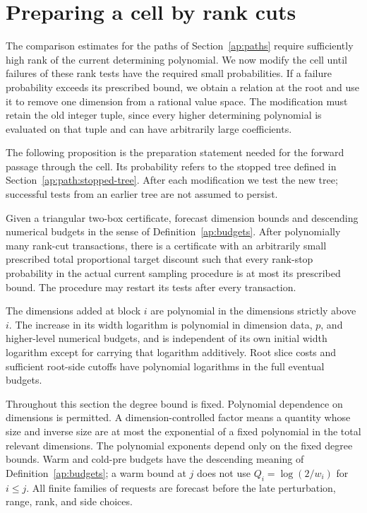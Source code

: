 \section{Preparing a cell by rank cuts}\label{ap:preparation}

The comparison estimates for the paths of Section~\ref{ap:paths}
require sufficiently high rank of the current determining polynomial. We now
modify the cell until failures of these rank tests have the required
small probabilities. If a failure probability exceeds its prescribed
bound, we obtain a relation at the root and use it to remove one
dimension from a rational value space. The modification must retain the old
integer tuple, since every higher determining polynomial is evaluated
on that tuple and can have arbitrarily large coefficients.

The following proposition is the preparation statement needed for
the forward passage through the cell. Its probability refers to the
stopped tree defined in Section~\ref{ap:path:stopped-tree}. After each modification
we test the new tree; successful tests from an earlier tree are not
assumed to persist.

\begin{proposition}
\label{ap:major:preparation}
Given a triangular two-box certificate, forecast dimension bounds
and descending numerical budgets in the sense of
Definition~\ref{ap:budgets}.  After polynomially
many rank-cut transactions, there is a certificate with an
arbitrarily small prescribed total proportional target discount
such that every rank-stop probability in the actual current
sampling procedure is at most its prescribed bound.  The
procedure may restart its tests after every transaction.

The dimensions added at block $i$ are polynomial in the dimensions
strictly above $i$.  The increase in its width logarithm is
polynomial in dimension data, $p$, and higher-level numerical
budgets, and is independent of its own initial width logarithm
except for carrying that logarithm additively.  Root slice costs
and sufficient root-side cutoffs have polynomial logarithms in
the full eventual budgets.
\end{proposition}

Throughout this section the degree bound is fixed. Polynomial
dependence on dimensions is permitted. A dimension-controlled factor
means a quantity whose size and inverse size are at most the
exponential of a fixed polynomial in the total relevant dimensions.
The polynomial exponents depend only on the fixed degree bounds.
Warm and cold-pre budgets have the
descending meaning of Definition~\ref{ap:budgets}; a warm bound at
$j$ does not use $Q_i=\log(2/w_i)$ for $i\le j$. All finite
families of requests are forecast before the late perturbation,
range, rank, and side choices.

